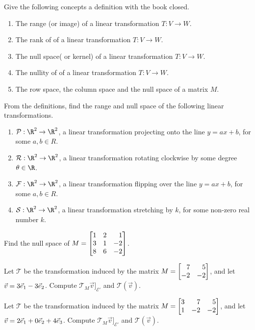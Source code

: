 \begin{exercises}
	\begin{problist}
	    \prob Give the following concepts a definition with the book closed.
	    \begin{enumerate}
	        \item The range (or image) of a linear transformation $T: V \to W$.
	        \item The rank of of a linear transformation $T: V \to W$.
	        \item The null space( or kernel) of a linear transformation $T: V \to W$.
	        \item The nullity of  of a linear transformation $T: V \to W$.
	        \item The row space, the column space and the null space of a matrix $M$.
	        
	    \end{enumerate}
		\prob  From the definitions, find the range and null space of the following linear transformations.
		\begin{enumerate}
		    \item   $\mathcal P:\R^2\to\R^2$, a linear transformation projecting onto the line $y=ax+b$, for some $a,b \in R$.
			\item   $\mathcal R:\R^2\to\R^2$, a linear transformation rotating clockwise by some degree $\theta\in\R$.
			\item   $\mathcal F:\R^2\to\R^2$, a linear transformation flipping over the line $y=ax+b$, for some $a,b \in R$.
			\item   $\mathcal S:\R^2\to\R^2$, a linear transformation stretching by $k$, for some non-zero real number $k$.
		\end{enumerate}
		
		\prob Find the null space of $M=\mat{1&2&1\\3&1&-2\\8&6&-2}$.
		
		\prob Let $\mathcal T$ be the transformation induced by the matrix $M=\mat{7&5\\-2&-2}$,
	    and let $\vec v=3{\vec e_1}-3{\vec e_2}$. Compute $\mathcal T_{M}\vec v]_{\mathcal E'}$ and $\mathcal T(\vec v)$.
	    
	    \prob Let $\mathcal T$ be the transformation induced by the matrix $M=\mat{3&7&5\\1&-2&-2}$,
	    and let $\vec v=2{\vec e_1}+0{\vec e_2}+4{\vec e_3}$. Compute $\mathcal T_{M}\vec v]_{\mathcal E'}$ and $\mathcal T(\vec v)$.
		

\end{problist}
\end{exercises}

